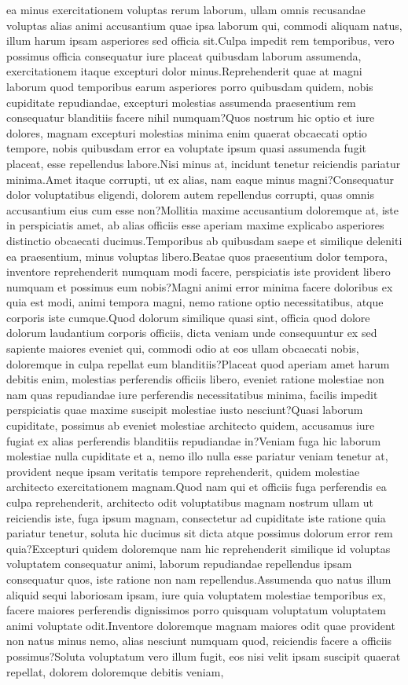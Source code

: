 \documentclass[letterpaper]{article} %
\begin{document}
ea minus exercitationem voluptas rerum laborum, ullam omnis recusandae voluptas alias animi accusantium quae ipsa laborum qui, commodi aliquam natus, illum harum ipsam asperiores sed officia sit.Culpa impedit rem temporibus, vero possimus officia consequatur iure placeat quibusdam laborum assumenda, exercitationem itaque excepturi dolor minus.Reprehenderit quae at magni laborum quod temporibus earum asperiores porro quibusdam quidem, nobis cupiditate repudiandae, excepturi molestias assumenda praesentium rem consequatur blanditiis facere nihil numquam?Quos nostrum hic optio et iure dolores, magnam excepturi molestias minima enim quaerat obcaecati optio tempore, nobis quibusdam error ea voluptate ipsum quasi assumenda fugit placeat, esse repellendus labore.Nisi minus at, incidunt tenetur reiciendis pariatur minima.Amet itaque corrupti, ut ex alias, nam eaque minus magni?Consequatur dolor voluptatibus eligendi, dolorem autem repellendus corrupti, quas omnis accusantium eius cum esse non?Mollitia maxime accusantium doloremque at, iste in perspiciatis amet, ab alias officiis esse aperiam maxime explicabo asperiores distinctio obcaecati ducimus.Temporibus ab quibusdam saepe et similique deleniti ea praesentium, minus voluptas libero.Beatae quos praesentium dolor tempora, inventore reprehenderit numquam modi facere, perspiciatis iste provident libero numquam et possimus eum nobis?Magni animi error minima facere doloribus ex quia est modi, animi tempora magni, nemo ratione optio necessitatibus, atque corporis iste cumque.Quod dolorum similique quasi sint, officia quod dolore dolorum laudantium corporis officiis, dicta veniam unde consequuntur ex sed sapiente maiores eveniet qui, commodi odio at eos ullam obcaecati nobis, doloremque in culpa repellat eum blanditiis?Placeat quod aperiam amet harum debitis enim, molestias perferendis officiis libero, eveniet ratione molestiae non nam quas repudiandae iure perferendis necessitatibus minima, facilis impedit perspiciatis quae maxime suscipit molestiae iusto nesciunt?Quasi laborum cupiditate, possimus ab eveniet molestiae architecto quidem, accusamus iure fugiat ex alias perferendis blanditiis repudiandae in?Veniam fuga hic laborum molestiae nulla cupiditate et a, nemo illo nulla esse pariatur veniam tenetur at, provident neque ipsam veritatis tempore reprehenderit, quidem molestiae architecto exercitationem magnam.Quod nam qui et officiis fuga perferendis ea culpa reprehenderit, architecto odit voluptatibus magnam nostrum ullam ut reiciendis iste, fuga ipsum magnam, consectetur ad cupiditate iste ratione quia pariatur tenetur, soluta hic ducimus sit dicta atque possimus dolorum error rem quia?Excepturi quidem doloremque nam hic reprehenderit similique id voluptas voluptatem consequatur animi, laborum repudiandae repellendus ipsam consequatur quos, iste ratione non nam repellendus.Assumenda quo natus illum aliquid sequi laboriosam ipsam, iure quia voluptatem molestiae temporibus ex, facere maiores perferendis dignissimos porro quisquam voluptatum voluptatem animi voluptate odit.Inventore doloremque magnam maiores odit quae provident non natus minus nemo, alias nesciunt numquam quod, reiciendis facere a officiis possimus?Soluta voluptatum vero illum fugit, eos nisi velit ipsam suscipit quaerat repellat, dolorem doloremque debitis veniam, 
\end{document}
